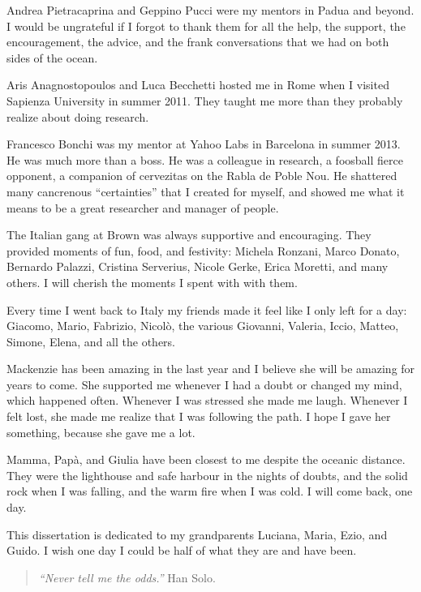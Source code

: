 Andrea Pietracaprina and Geppino Pucci were my mentors in Padua and beyond. I
would be ungrateful if I forgot to thank them for all the help, the support, the
encouragement, the advice, and the frank conversations that we had on both sides
of the ocean.

Aris Anagnostopoulos and Luca Becchetti hosted me in Rome when I visited
Sapienza University in summer 2011. They taught me more than they probably
realize about doing research. 

Francesco Bonchi was my mentor at Yahoo Labs in Barcelona in summer 2013. He
was much more than a boss. He was a colleague in research, a foosball fierce
opponent, a companion of cervezitas on the Rabla de Poble Nou.  He shattered
many cancrenous ``certainties'' that I created for myself, and showed me what it
means to be a great researcher and manager of people.

The Italian gang at Brown was always supportive and encouraging. They provided
moments of fun, food, and festivity:  Michela Ronzani, Marco Donato, Bernardo
Palazzi, Cristina Serverius, Nicole Gerke, Erica Moretti, and many others.
I will cherish the moments I spent with with them.

Every time I went back to Italy my friends made it feel like I only
left for a day: Giacomo, Mario, Fabrizio, Nicol\`o, the various Giovanni,
Valeria, Iccio, Matteo, Simone, Elena, and all the others. 

Mackenzie has been amazing in the last year and I believe she will be
amazing for years to come. She supported me whenever I had a doubt or changed
my mind, which happened often. Whenever I was stressed she made me laugh.
Whenever I felt lost, she made me realize that I was following the path. I hope
I gave her something, because she gave me a lot.

Mamma, Pap\`a, and Giulia have been closest to me despite the oceanic distance.
They were the lighthouse and safe harbour in the nights of doubts, and the solid
rock when I was falling, and the warm fire when I was cold. I will come back,
one day.

This dissertation is dedicated to my grandparents Luciana, Maria, Ezio, and
Guido. I wish one day I could be half of what they are and have been.

\begin{quote}
  {\em ``Never tell me the odds.''} Han Solo.
\end{quote}


